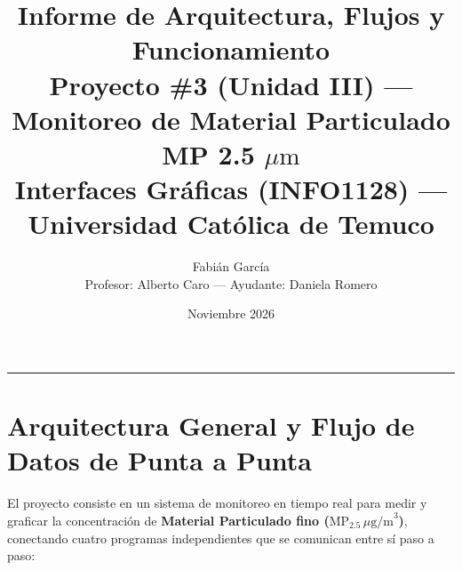 \documentclass[11pt,a4paper]{article}
\title{\textbf{\textcolor{azuluct}{Informe de Arquitectura, Flujos y Funcionamiento}}\\
\Large Proyecto \#3 (Unidad III) --- Monitoreo de Material Particulado MP 2.5 $\mu\text{m}$\\
\normalsize Interfaces Gráficas (INFO1128) --- Universidad Católica de Temuco}
\author{Fabián García \\ \small Profesor: Alberto Caro --- Ayudante: Daniela Romero}
\date{Noviembre 2026}
\begin{document}
\maketitle
\vspace{-0.5em}
\hrule
\vspace{0.8em}

\section{Arquitectura General y Flujo de Datos de Punta a Punta}

El proyecto consiste en un sistema de monitoreo en tiempo real para medir y graficar la concentración de \textbf{Material Particulado fino ($\text{MP}_{2.5}\,\mu\text{g/m}^3$)}, conectando cuatro programas independientes que se comunican entre sí paso a paso:
\end{document}
